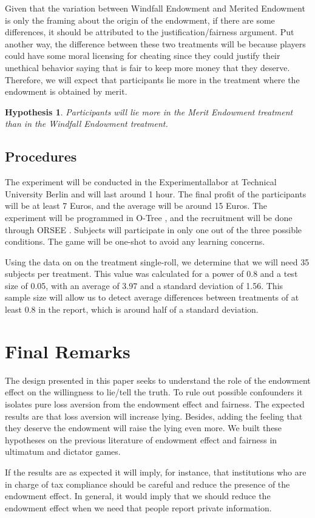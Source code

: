 \documentclass[12pt,final]{article}
\newtheorem{hypothesis}{Hypothesis}
\begin{document}
Given that the variation between Windfall Endowment and Merited Endowment is only the framing about the origin of the endowment, if there are some differences, it should be attributed to the justification/fairness argument. Put another way, the difference between these two treatments will be because players could have some moral licensing for cheating since they could justify their unethical behavior saying that is fair to keep more money that they deserve. Therefore, we will expect that participants lie more in the treatment where the endowment is obtained by merit.

\begin{hypothesis}
	Participants will lie more in the Merit Endowment treatment than in the Windfall Endowment treatment.
\end{hypothesis}

\subsection{Procedures}

The experiment will be conducted in the Experimentallabor at Technical University Berlin and will last around 1 hour. The final profit of the participants will be at least 7 Euros, and the average will be around 15 Euros. The experiment will be programmed in O-Tree \citep{Chen2016}, and the recruitment will be done through ORSEE \citep{Greiner2015}. Subjects will participate in only one out of the three possible conditions. The game will be one-shot to avoid any learning concerns.

Using the data on \citet{Shalvi2011} on the treatment single-roll, we determine that we will need 35 subjects per treatment. This value was calculated for a power of 0.8 and a test size of 0.05, with an average of 3.97 and a standard deviation of 1.56. This sample size will allow us to detect average differences between treatments of at least 0.8 in the report, which is around half of a standard deviation. 

\section{Final Remarks}

The design presented in this paper seeks to understand the role of the endowment effect on the willingness to lie/tell the truth. To rule out possible confounders it isolates pure loss aversion from the endowment effect and fairness. The expected results are that loss aversion will increase lying. Besides, adding the feeling that they deserve the endowment will raise the lying even more. We built these hypotheses on the previous literature of endowment effect and fairness in ultimatum and dictator games. 

If the results are as expected it will imply, for instance, that institutions who are in charge of tax compliance should be careful and reduce the presence of the endowment effect. In general, it would imply that we should reduce the endowment effect when we need that people report private information.




\end{document}
